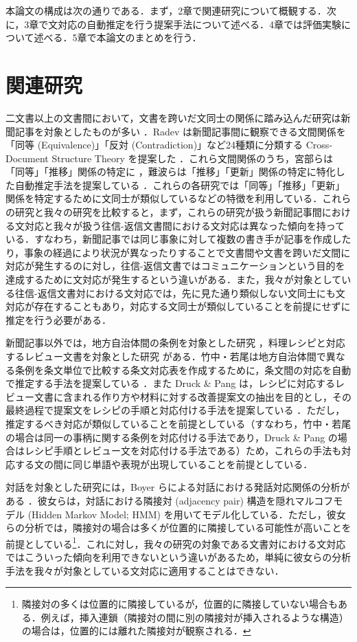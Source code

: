 \documentclass[japanese]{jnlp_1.4}
\begin{document}
本論文の構成は次の通りである．まず，2章で関連研究について概観する．次に，3章で文対応の自動推定を行う提案手法について述べる．4章では評価実験について述べる．5章で本論文のまとめを行う．


\section{関連研究}

二文書以上の文書間において，文書を跨いだ文同士の関係に踏み込んだ研究は新聞記事を対象としたものが多い \cite{Radev2000,宮部:2005,宮部:2006,難波:2005}．Radev は新聞記事間に観察できる文間関係を「同等 (Equivalence)」「反対 (Contradiction)」など24種類に分類する Cross-Document Structure Theory を提案した \cite{Radev2000}．これら文間関係のうち，宮部らは「同等」「推移」関係の特定に \cite{宮部:2005,宮部:2006}，難波らは「推移」「更新」関係の特定に特化した自動推定手法を提案している \cite{難波:2005}．これらの各研究では「同等」「推移」「更新」関係を特定するために文同士が類似しているなどの特徴を利用している．これらの研究と我々の研究を比較すると，まず，これらの研究が扱う新聞記事間における文対応と我々が扱う往信-返信文書間における文対応は異なった傾向を持っている．すなわち，新聞記事では同じ事象に対して複数の書き手が記事を作成したり，事象の経過により状況が異なったりすることで文書間や文書を跨いだ文間に対応が発生するのに対し，往信-返信文書ではコミュニケーションという目的を達成するために文対応が発生するという違いがある．また，我々が対象としている往信-返信文書対における文対応では，先に見た通り類似しない文同士にも文対応が存在することもあり，対応する文同士が類似していることを前提にせずに推定を行う必要がある．

新聞記事以外では，地方自治体間の条例を対象とした研究 \cite{竹中要一:2012-09-30}，料理レシピと対応するレビュー文書を対象とした研究 \cite{Druck2012} がある．竹中・若尾は地方自治体間で異なる条例を条文単位で比較する条文対応表を作成するために，条文間の対応を自動で推定する手法を提案している \cite{竹中要一:2012-09-30}．また Druck \& Pang は，レシピに対応するレビュー文書に含まれる作り方や材料に対する改善提案文の抽出を目的とし，その最終過程で提案文をレシピの手順と対応付ける手法を提案している \cite{Druck2012}．ただし，推定するべき対応が類似していることを前提としている（すなわち，竹中・若尾の場合は同一の事柄に関する条例を対応付ける手法であり，Druck \& Pang の場合はレシピ手順とレビュー文を対応付ける手法である）ため，これらの手法も対応する文の間に同じ単語や表現が出現していることを前提としている．

対話を対象とした研究には，Boyer らによる対話における発話対応関係の分析がある \cite{Boyer2009}．彼女らは，対話における隣接対 (adjacency pair) 構造を隠れマルコフモデル (Hidden Markov Model; HMM) を用いてモデル化している．ただし，彼女らの分析では，隣接対の場合は多くが位置的に隣接している可能性が高いことを前提としている\footnote{隣接対の多くは位置的に隣接しているが，位置的に隣接していない場合もある．例えば，挿入連鎖（隣接対の間に別の隣接対が挿入されるような構造）の場合は，位置的には離れた隣接対が観察される．}．これに対し，我々の研究の対象である文書対における文対応ではこういった傾向を利用できないという違いがあるため，単純に彼女らの分析手法を我々が対象としている文対応に適用することはできない．
\end{document}
